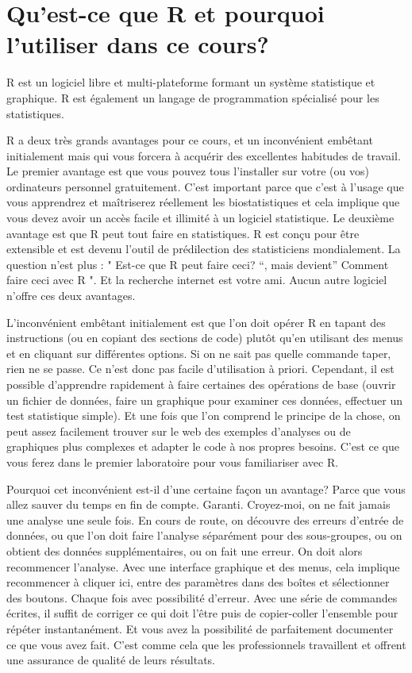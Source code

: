 \documentclass[12pt,]{book}
\begin{document}
\hypertarget{quest-ce-que-r-et-pourquoi-lutiliser-dans-ce-cours}{%
\section*{Qu'est-ce que R et pourquoi l'utiliser dans ce cours?}\label{quest-ce-que-r-et-pourquoi-lutiliser-dans-ce-cours}}

R est un logiciel libre et multi-plateforme formant un système statistique et graphique.
R est également un langage de programmation spécialisé pour les statistiques.

R a deux très grands avantages pour ce cours, et un inconvénient embêtant initialement mais qui vous forcera à acquérir des excellentes habitudes de travail.
Le premier avantage est que vous pouvez tous l'installer sur votre (ou vos) ordinateurs personnel gratuitement.
C'est important parce que c'est à l'usage que vous apprendrez et maîtriserez réellement les biostatistiques et cela implique que vous devez avoir un accès facile et illimité à un logiciel statistique.
Le deuxième avantage est que R peut tout faire en statistiques.
R est conçu pour être extensible et est devenu l'outil de prédilection des statisticiens mondialement.
La question n'est plus : " Est-ce que R peut faire ceci? ``, mais devient'' Comment faire ceci avec R ".
Et la recherche internet est votre ami.
Aucun autre logiciel n'offre ces deux avantages.

L'inconvénient embêtant initialement est que l'on doit opérer R en tapant des instructions (ou en copiant des sections de code) plutôt qu'en utilisant des menus et en cliquant sur différentes options.
Si on ne sait pas quelle commande taper, rien ne se passe.
Ce n'est donc pas facile d'utilisation à priori.
Cependant, il est possible d'apprendre rapidement à faire certaines des opérations de base (ouvrir un fichier de données, faire un graphique pour examiner ces données, effectuer un test statistique simple).
Et une fois que l'on comprend le principe de la chose, on peut assez facilement trouver sur le web des exemples d'analyses ou de graphiques plus complexes et adapter le code à nos propres besoins.
C'est ce que vous ferez dans le premier laboratoire pour vous familiariser avec R.

Pourquoi cet inconvénient est-il d'une certaine façon un avantage? Parce que vous allez sauver du temps en fin de compte.
Garanti.
Croyez-moi, on ne fait jamais une analyse une seule fois.
En cours de route, on découvre des erreurs d'entrée de données, ou que l'on doit faire l'analyse séparément pour des sous-groupes, ou on obtient des données supplémentaires, ou on fait une erreur.
On doit alors recommencer l'analyse.
Avec une interface graphique et des menus, cela implique recommencer à cliquer ici, entre des paramètres dans des boîtes et sélectionner des boutons.
Chaque fois avec possibilité d'erreur.
Avec une série de commandes écrites, il suffit de corriger ce qui doit l'être puis de copier-coller l'ensemble pour répéter instantanément.
Et vous avez la possibilité de parfaitement documenter ce que vous avez fait.
C'est comme cela que les professionnels travaillent et offrent une assurance de qualité de leurs résultats.
\end{document}
